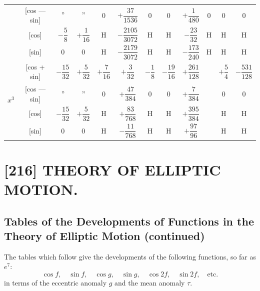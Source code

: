 \documentclass[11pt,a4paper]{book}
\begin{document}
\begin{center}
\begin{tabular}{|c|c|c|c|c|c|c|c|c|c|c|c|}
& [cos --- sin] & $"$ & $"$ & $0$ & $+\dfrac{37}{1536}$ & $0$ & $0$ & $+\dfrac{1}{480}$ & $0$ & $0$ & $0$ \\
& [cos] & $-\dfrac{5}{8}$ & $+\dfrac{1}{16}$ & H & $-\dfrac{2105}{3072}$ & H & H & $-\dfrac{23}{32}$ & H & H & H \\
& [sin] & $0$ & $0$ & H & $-\dfrac{2179}{3072}$ & H & H & $-\dfrac{173}{240}$ & H & H & H \\
\hline
\multirow{4}{*}{$x^3$} & [cos + sin] & $-\dfrac{15}{32}$ & $+\dfrac{5}{32}$ & $+\dfrac{7}{16}$ & $+\dfrac{3}{32}$ & $-\dfrac{1}{8}$ & $-\dfrac{19}{16}$ & $+\dfrac{261}{128}$ & & $+\dfrac{5}{4}$ & $-\dfrac{531}{128}$ \\
& [cos --- sin] & $"$ & $"$ & $0$ & $+\dfrac{47}{384}$ & $0$ & $0$ & $+\dfrac{7}{384}$ & & $0$ & $0$ \\
& [cos] & $-\dfrac{15}{32}$ & $+\dfrac{5}{32}$ & H & $+\dfrac{83}{768}$ & H & H & $+\dfrac{395}{384}$ & & H & H \\
& [sin] & $0$ & $0$ & H & $-\dfrac{11}{768}$ & H & H & $+\dfrac{97}{96}$ & & H & H \\
\hline
\end{tabular}
\end{center}

\newpage
\clearpage



\section*{[216] THEORY OF ELLIPTIC MOTION.}

\subsection*{Tables of the Developments of Functions in the Theory of Elliptic Motion (continued)}

The tables which follow give the developments of the following functions, so far as $e^7$:
\[
\cos f, \quad \sin f, \quad \cos g, \quad \sin g, \quad \cos 2f, \quad \sin 2f, \quad \text{etc.}
\]
in terms of the eccentric anomaly $g$ and the mean anomaly $\tau$.
\end{document}
